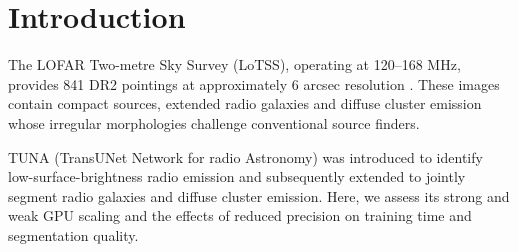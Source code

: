 \documentclass[11pt,twoside]{article}
\begin{document}
\begin{abstract}
Wide-area radio surveys require automated recovery of extended galaxies
and faint diffuse emission. We evaluate the segmentation quality and GPU
performance of TUNA, a convolutional--transformer segmentation network, on high-resolution LoTSS-DR2 images. TUNA identifies 1.76 million
connected detections, recovers 96.8\% of a reference radio-galaxy sample and
detects diffuse emission in 94.3\% of selected galaxy-cluster systems. We benchmark strong and weak GPU scaling and FP32, FP16 and BF16 training.
Two-GPU strong scaling and mixed-precision FP16 achieve speedups of
approximately $1.9\times$ and $1.98\times$, respectively, without appreciable
changes in test-set segmentation metrics. These results demonstrate the
importance of jointly optimizing numerical precision and GPU allocation.
\end{abstract}




\section{Introduction}
The LOFAR Two-metre Sky Survey (LoTSS), operating at 120--168 MHz, provides
841 DR2 pointings at approximately 6 arcsec resolution
\citep{shimwell2022lofar}. These images contain compact sources, extended radio
galaxies and diffuse cluster emission whose irregular morphologies challenge
conventional source finders.

TUNA (TransUNet Network for radio Astronomy) was introduced to identify
low-surface-brightness radio emission \citep{Sanvitale2025} and subsequently
extended to jointly segment radio galaxies and diffuse cluster emission. Here, we assess its strong and weak GPU scaling and
the effects of reduced precision on training time and segmentation quality.
\end{document}
